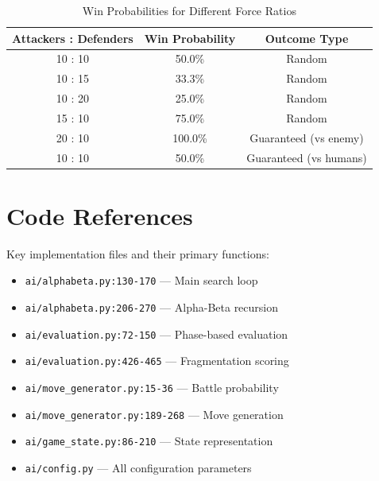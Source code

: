 \documentclass[11pt,a4paper]{article}
\begin{document}
\begin{table}[H]
\centering
\caption{Win Probabilities for Different Force Ratios}
\begin{tabular}{@{}ccc@{}}
\toprule
\textbf{Attackers : Defenders} & \textbf{Win Probability} & \textbf{Outcome Type} \\
\midrule
10 : 10 & 50.0\% & Random \\
10 : 15 & 33.3\% & Random \\
10 : 20 & 25.0\% & Random \\
15 : 10 & 75.0\% & Random \\
20 : 10 & 100.0\% & Guaranteed (vs enemy) \\
10 : 10 & 50.0\% & Guaranteed (vs humans) \\
\bottomrule
\end{tabular}
\end{table}

\section{Code References}

Key implementation files and their primary functions:

\begin{itemize}
    \item \texttt{ai/alphabeta.py:130-170} --- Main search loop
    \item \texttt{ai/alphabeta.py:206-270} --- Alpha-Beta recursion
    \item \texttt{ai/evaluation.py:72-150} --- Phase-based evaluation
    \item \texttt{ai/evaluation.py:426-465} --- Fragmentation scoring
    \item \texttt{ai/move\_generator.py:15-36} --- Battle probability
    \item \texttt{ai/move\_generator.py:189-268} --- Move generation
    \item \texttt{ai/game\_state.py:86-210} --- State representation
    \item \texttt{ai/config.py} --- All configuration parameters
\end{itemize}

\end{document}
